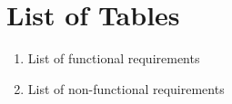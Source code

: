 \documentclass[12pt]{article}
\begin{document}
%
%	
%
%
%
%

\newpage
{}
\setcounter{page}{1}
\tableofcontents
\newpage
\listoffigures
\newpage

\section*{List of Tables}
\begin{enumerate}
    \item List of functional requirements 
    \item List of non-functional requirements 
\end{enumerate}
\end{document}
